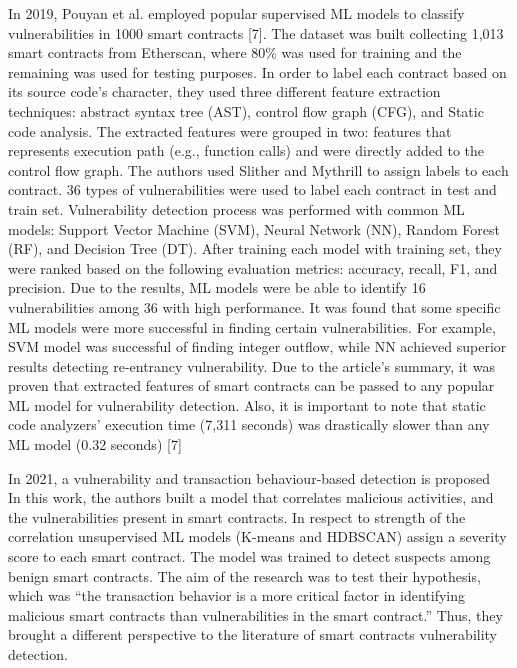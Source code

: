 In 2019, Pouyan et al. employed popular supervised ML models to classify vulnerabilities in 1000 smart contracts [7].
The dataset was built collecting 1,013 smart contracts from Etherscan, where 80\% was used for training and the remaining was used for testing purposes.
In order to label each contract based on its source code's character, they used three different feature extraction techniques: abstract syntax tree (AST), control flow graph (CFG), and Static code analysis.
The extracted features were grouped in two: features that represents execution path (e.g., function calls) and were directly added to the control flow graph. The authors used Slither and Mythrill to assign labels to each contract. 36 types of vulnerabilities were used to label each contract in test and train set. Vulnerability detection process was performed with common ML models: Support Vector Machine (SVM), Neural Network (NN), Random Forest (RF), and Decision Tree (DT). After training each model with training set, they were ranked based on the following evaluation metrics: accuracy, recall, F1, and precision. Due to the results, ML models were be able to identify 16 vulnerabilities among 36 with high performance. It was found that some specific ML models were more successful in finding certain vulnerabilities. For example, SVM model was successful of finding integer outflow, while NN achieved superior results detecting re-entrancy vulnerability. Due to the article’s summary, it was proven that extracted features of smart contracts can be passed to any popular ML model for vulnerability detection. Also, it is important to note that static code analyzers' execution time (7,311 seconds) was drastically slower than any ML model (0.32 seconds) [7]

In 2021, a vulnerability and transaction behaviour-based detection is proposed ~\cite{contractfuzzer}
 In this work, the authors built a model that correlates malicious activities, and the vulnerabilities present in smart contracts.
 In respect to strength of the correlation unsupervised ML models (K-means and HDBSCAN) assign a severity score to each smart contract.
 The model was trained to detect suspects among benign smart contracts. The aim of the research was to test their hypothesis, which was “the transaction behavior is a more critical factor in identifying malicious smart contracts than vulnerabilities in the smart contract.” Thus, they brought a different perspective to the literature of smart contracts vulnerability detection.

